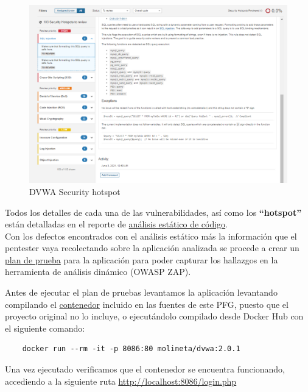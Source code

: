 \begin{figure}[!htb]
    \captionsetup{width=1\linewidth}  
    \includegraphics[width=\linewidth]{./imagenes/04_1_2_01_DVWA_Securityhotspots.png}
    \caption{DVWA Security hotspot}  
    \label{fig:DVWA Security hotspot}
\end{figure}

Todos los detalles de cada una de las vulnerabilidades, así como los \textbf{“hotspot”} están detalladas en el reporte 
de \href{https://github.com/M0l1n3ta/PFG/blob/master/Reportes/An%C3%A1lisis estatico de c%C3%B3digo/ReporteAnalisisestatico_dvwa.docx}{análisis estático de código}.\\

Con los defectos encontrados con el análisis estático más la información que el pentester vaya recolectando sobre la aplicación
analizada se procede a crear un \href{https://github.com/M0l1n3ta/PFG/blob/master/Scripts/Plan Pruebas/PlanPruebas_DVWA.ps1}{plan de prueba}
para la aplicación para poder capturar los hallazgos en la herramienta de análisis dinámico (OWASP ZAP).

\newpage
Antes de ejecutar el plan de pruebas levantamos la aplicación levantando compilando el \href{https://github.com/M0l1n3ta/PFG/blob/master/EntornoPruebas/dvwa/dockerfile}{contenedor} 
incluido en las fuentes de este PFG, puesto que el proyecto original no lo incluye, o ejecutándolo compilado desde Docker Hub 
con el siguiente comando:

\begin{verbatim}
    docker run --rm -it -p 8086:80 molineta/dvwa:2.0.1
\end{verbatim}

Una vez ejecutado verificamos que el contenedor se encuentra funcionando, accediendo a la siguiente 
ruta \url{http://localhost:8086/login.php}\\

